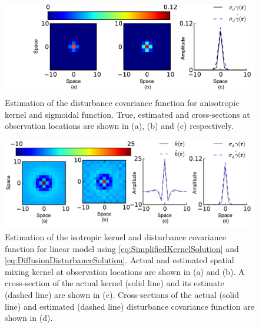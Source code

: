 \documentclass[10pt,twocolumn,twoside]{IEEEtran}
\begin{document}
\begin{figure}[ht]
	\centering
		\includegraphics[scale=1]{./Graph/DisturbanceWidthEstimation.pdf}
	\caption{Estimation of the disturbance covariance function for anisotropic kernel and sigmoidal function. True, estimated and cross-sections at observation locations are shown in (a), (b) and (c) respectively.}
	\label{fig:label}
\end{figure}
\begin{figure}[ht]
	\centering
		\includegraphics[scale=1]{./Graph/DisturbanceKernelEstimationLineariso.pdf}
	\caption{Estimation of the isotropic kernel and disturbance covariance function for linear model using \eqref{eq:SimplifiedKernelSolution} and \eqref{eq:DiffusionDisturbanceSolution}. Actual and  estimated spatial mixing kernel at observation locations are shown in (a) and (b).  A cross-section of the actual kernel (solid line) and its estimate  (dashed line) are shown in (c). Cross-sections of the actual (solid line) and estimated (dashed line) disturbance covariance function are shown in (d).}
	\label{fig:DiffusionIso} 
	\end{figure}
	
\end{document}
